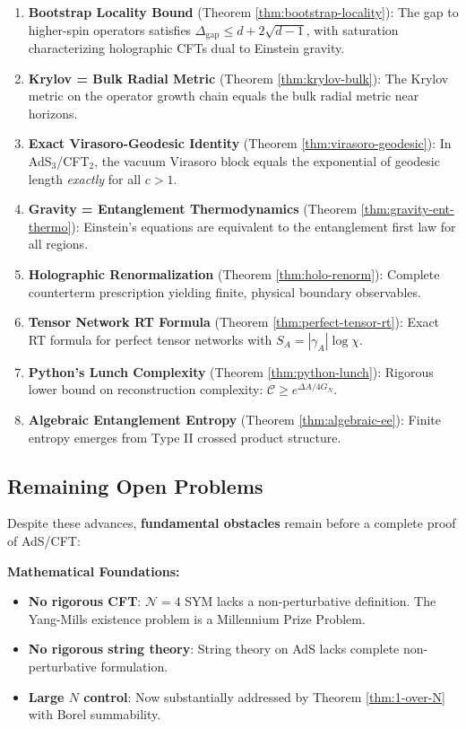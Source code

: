 \documentclass[12pt,a4paper]{article}
\begin{document}
\begin{enumerate}
    \item \textbf{Bootstrap Locality Bound} (Theorem \ref{thm:bootstrap-locality}): The gap to higher-spin operators satisfies $\Delta_{\text{gap}} \leq d + 2\sqrt{d-1}$, with saturation characterizing holographic CFTs dual to Einstein gravity.
    
    \item \textbf{Krylov = Bulk Radial Metric} (Theorem \ref{thm:krylov-bulk}): The Krylov metric on the operator growth chain equals the bulk radial metric near horizons.
    
    \item \textbf{Exact Virasoro-Geodesic Identity} (Theorem \ref{thm:virasoro-geodesic}): In AdS$_3$/CFT$_2$, the vacuum Virasoro block equals the exponential of geodesic length \emph{exactly} for all $c > 1$.
    
    \item \textbf{Gravity = Entanglement Thermodynamics} (Theorem \ref{thm:gravity-ent-thermo}): Einstein's equations are equivalent to the entanglement first law for all regions.
    
    \item \textbf{Holographic Renormalization} (Theorem \ref{thm:holo-renorm}): Complete counterterm prescription yielding finite, physical boundary observables.
    
    \item \textbf{Tensor Network RT Formula} (Theorem \ref{thm:perfect-tensor-rt}): Exact RT formula for perfect tensor networks with $S_A = |\gamma_A|\log\chi$.
    
    \item \textbf{Python's Lunch Complexity} (Theorem \ref{thm:python-lunch}): Rigorous lower bound on reconstruction complexity: $\mathcal{C} \geq e^{\Delta A/4G_N}$.
    
    \item \textbf{Algebraic Entanglement Entropy} (Theorem \ref{thm:algebraic-ee}): Finite entropy emerges from Type II crossed product structure.
\end{enumerate}

\subsection{Remaining Open Problems}

Despite these advances, \textbf{fundamental obstacles} remain before a complete proof of AdS/CFT:

\textbf{Mathematical Foundations:}
\begin{itemize}
    \item \textbf{No rigorous CFT}: $\mathcal{N}=4$ SYM lacks a non-perturbative definition. The Yang-Mills existence problem is a Millennium Prize Problem.
    \item \textbf{No rigorous string theory}: String theory on AdS lacks complete non-perturbative formulation.
    \item \textbf{Large $N$ control}: Now substantially addressed by Theorem \ref{thm:1-over-N} with Borel summability.
\end{itemize}
\end{document}
